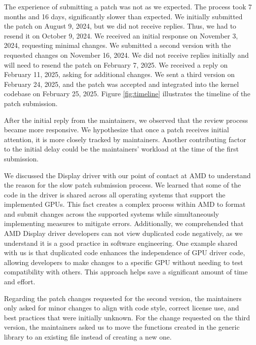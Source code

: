 \documentclass[10pt,conference]{IEEEtran}
\begin{document}
The experience of submitting a patch was not as we expected. The process took 7 months and 16 days, significantly slower than expected. We initially submitted the patch on August 9, 2024, but we did not receive replies. Thus, we had to resend it on October 9, 2024. We received an initial response on November 3, 2024, requesting minimal changes. We submitted a second version with the requested changes on November 16, 2024. We did not receive replies initially and will need to resend the patch on February 7, 2025. We received a reply on February 11, 2025, asking for additional changes. We sent a third version on February 24, 2025, and the patch was accepted and integrated into the kernel codebase on February 25, 2025. Figure \ref{fig:timeline} illustrates the timeline of the patch submission.

After the initial reply from the maintainers, we observed that the review process became more responsive. We hypothesize that once a patch receives initial attention, it is more closely tracked by maintainers. Another contributing factor to the initial delay could be the maintainers' workload at the time of the first submission.

We discussed the Display driver with our point of contact at AMD to understand the reason for the slow patch submission process. We learned that some of the code in the driver is shared across all operating systems that support the implemented GPUs. This fact creates a complex process within AMD to format and submit changes across the supported systems while simultaneously implementing measures to mitigate errors. Additionally, we comprehended that AMD Display driver developers can not view duplicated code negatively, as we understand it is a good practice in software engineering. One example shared with us is that duplicated code enhances the independence of GPU driver code, allowing developers to make changes to a specific GPU without needing to test compatibility with others. This approach helps save a significant amount of time and effort.

Regarding the patch changes requested for the second version, the maintainers only asked for minor changes to align with code style, correct license use, and best practices that were initially unknown. For the change requested on the third version, the maintainers asked us to move the functions created in the generic library to an existing file instead of creating a new one.
\end{document}
